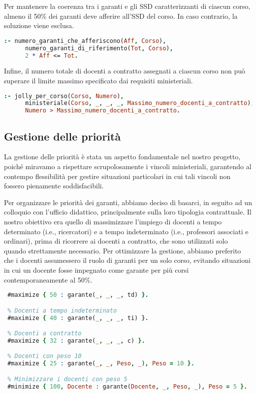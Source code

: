 Per mantenere la coerenza tra i garanti e gli SSD caratterizzanti di ciascun corso, almeno 
il 50\% dei garanti deve afferire all'SSD del corso. In caso contrario, la soluzione viene esclusa.

\begin{lstlisting}[language=prolog, caption={Vincolo sui garanti afferenti al SSD caratterizzante.}]
 :- numero_garanti_che_afferiscono(Aff, Corso),
      numero_garanti_di_riferimento(Tot, Corso),
      2 * Aff <= Tot.
\end{lstlisting}

Infine, il numero totale di docenti a contratto assegnati a ciascun corso non può superare il 
limite massimo specificato dai requisiti ministeriali.

\begin{lstlisting}[language=prolog, caption={Vincolo sul numero massimo di docenti a contratto.}]
 :- jolly_per_corso(Corso, Numero),
      ministeriale(Corso, _, _, _, Massimo_numero_docenti_a_contratto),
      Numero > Massimo_numero_docenti_a_contratto.
\end{lstlisting}






\subsection{Gestione delle priorità}\label{sec:priorita}
La gestione delle priorità è stata un aspetto fondamentale nel nostro progetto, poiché 
miravamo a rispettare scrupolosamente i vincoli ministeriali, garantendo al contempo 
flessibilità per gestire situazioni particolari in cui tali vincoli non fossero 
pienamente soddisfacibili.

Per organizzare le priorità dei garanti, abbiamo deciso di basarci, in seguito ad un 
colloquio con l'ufficio didattico, principalmente sulla loro tipologia contrattuale. 
Il nostro obiettivo era quello di massimizzare l'impiego di docenti a tempo determinato 
(i.e., ricercatori) e a tempo indeterminato (i.e., professori associati e ordinari), prima 
di ricorrere ai docenti a contratto, che sono utilizzati solo quando strettamente necessario. 
Per ottimizzare la gestione, abbiamo preferito che i docenti assumessero il ruolo di 
garanti per un solo corso, evitando situazioni in cui un docente fosse impegnato come 
garante per più corsi contemporaneamente al 50\%.

\begin{lstlisting}[language=prolog, caption=Gestione delle priorità dei docenti.]
 % Docenti a tempo determinato (ricercatori)
 #maximize { 50 : garante(_, _, _, td) }.

 % Docenti a tempo indeterminato
 #maximize { 40 : garante(_, _, _, ti) }.

 % Docenti a contratto
 #maximize { 32 : garante(_, _, _, c) }.

 % Docenti con peso 10
 #maximize { 25 : garante(_, _, Peso, _), Peso = 10 }.

 % Minimizzare i docenti con peso 5
 #minimize { 100, Docente : garante(Docente, _, Peso, _), Peso = 5 }.
\end{lstlisting}

